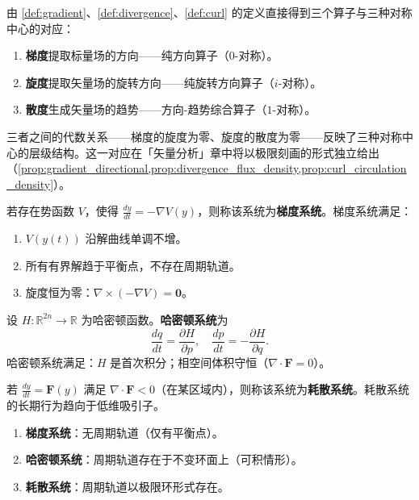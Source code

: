 \begin{remark}\label{rem:three_operators_direction_trend}
由 \cref{def:gradient}、\cref{def:divergence}、\cref{def:curl} 的定义直接得到三个算子与三种对称中心的对应：
\begin{enumerate}[label=(\roman*)]
    \item \textbf{梯度}提取标量场的方向——纯方向算子（$0$-对称）。
    \item \textbf{旋度}提取矢量场的旋转方向——纯旋转方向算子（$i$-对称）。
    \item \textbf{散度}生成矢量场的趋势——方向-趋势综合算子（$1$-对称）。
\end{enumerate}
三者之间的代数关系——梯度的旋度为零、旋度的散度为零——反映了三种对称中心的层级结构。这一对应在「矢量分析」章中将以极限刻画的形式独立给出（\cref{prop:gradient_directional,prop:divergence_flux_density,prop:curl_circulation_density}）。
\end{remark}

\begin{definition}\label{def:gradient_system}
若存在势函数 $V$，使得 $\frac{dy}{dt} = -\nabla V(y)$，则称该系统为\textbf{梯度系统}。梯度系统满足：
\begin{enumerate}[label=(\roman*)]
    \item $V(y(t))$ 沿解曲线单调不增。
    \item 所有有界解趋于平衡点，不存在周期轨道。
    \item 旋度恒为零：$\nabla \times (-\nabla V) = \mathbf{0}$。
\end{enumerate}
\end{definition}

\begin{definition}\label{def:hamiltonian_system}
设 $H: \mathbb{R}^{2n} \to \mathbb{R}$ 为哈密顿函数。\textbf{哈密顿系统}为
\[
\frac{dq}{dt} = \frac{\partial H}{\partial p}, \quad \frac{dp}{dt} = -\frac{\partial H}{\partial q}.
\]
哈密顿系统满足：$H$ 是首次积分；相空间体积守恒（$\nabla \cdot \mathbf{F} = 0$）。
\end{definition}

\begin{definition}\label{def:dissipative_system}
若 $\frac{dy}{dt} = \mathbf{F}(y)$ 满足 $\nabla \cdot \mathbf{F} < 0$（在某区域内），则称该系统为\textbf{耗散系统}。耗散系统的长期行为趋向于低维吸引子。
\end{definition}

\begin{theorem}[三种算子系统的周期轨道特征]\label{thm:three_operator_periodic}
\begin{enumerate}[label=(\roman*)]
    \item \textbf{梯度系统}：无周期轨道（仅有平衡点）。
    \item \textbf{哈密顿系统}：周期轨道存在于不变环面上（可积情形）。
    \item \textbf{耗散系统}：周期轨道以极限环形式存在。
\end{enumerate}
\end{theorem}

